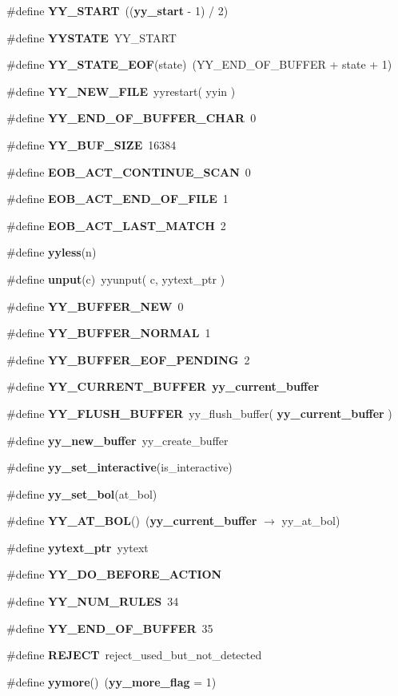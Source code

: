 \begin{CompactItemize}
\item 
\#define {\bf YY\_\-START}\ (({\bf yy\_\-start} - 1) / 2)
\item 
\#define {\bf YYSTATE}\ YY\_\-START
\item 
\#define {\bf YY\_\-STATE\_\-EOF}(state)\ (YY\_\-END\_\-OF\_\-BUFFER + state + 1)
\item 
\#define {\bf YY\_\-NEW\_\-FILE}\ yyrestart( yyin )
\item 
\#define {\bf YY\_\-END\_\-OF\_\-BUFFER\_\-CHAR}\ 0
\item 
\#define {\bf YY\_\-BUF\_\-SIZE}\ 16384
\item 
\#define {\bf EOB\_\-ACT\_\-CONTINUE\_\-SCAN}\ 0
\item 
\#define {\bf EOB\_\-ACT\_\-END\_\-OF\_\-FILE}\ 1
\item 
\#define {\bf EOB\_\-ACT\_\-LAST\_\-MATCH}\ 2
\item 
\#define {\bf yyless}(n)
\item 
\#define {\bf unput}(c)\ yyunput( c, yytext\_\-ptr )
\item 
\#define {\bf YY\_\-BUFFER\_\-NEW}\ 0
\item 
\#define {\bf YY\_\-BUFFER\_\-NORMAL}\ 1
\item 
\#define {\bf YY\_\-BUFFER\_\-EOF\_\-PENDING}\ 2
\item 
\#define {\bf YY\_\-CURRENT\_\-BUFFER}\ {\bf yy\_\-current\_\-buffer}
\item 
\#define {\bf YY\_\-FLUSH\_\-BUFFER}\ yy\_\-flush\_\-buffer( {\bf yy\_\-current\_\-buffer} )
\item 
\#define {\bf yy\_\-new\_\-buffer}\ yy\_\-create\_\-buffer
\item 
\#define {\bf yy\_\-set\_\-interactive}(is\_\-interactive)
\item 
\#define {\bf yy\_\-set\_\-bol}(at\_\-bol)
\item 
\#define {\bf YY\_\-AT\_\-BOL}()\ ({\bf yy\_\-current\_\-buffer} $\rightarrow$ yy\_\-at\_\-bol)
\item 
\#define {\bf yytext\_\-ptr}\ yytext
\item 
\#define {\bf YY\_\-DO\_\-BEFORE\_\-ACTION}
\item 
\#define {\bf YY\_\-NUM\_\-RULES}\ 34
\item 
\#define {\bf YY\_\-END\_\-OF\_\-BUFFER}\ 35
\item 
\#define {\bf REJECT}\ reject\_\-used\_\-but\_\-not\_\-detected
\item 
\#define {\bf yymore}()\ ({\bf yy\_\-more\_\-flag} = 1)
\item 

\end{CompactItemize}
